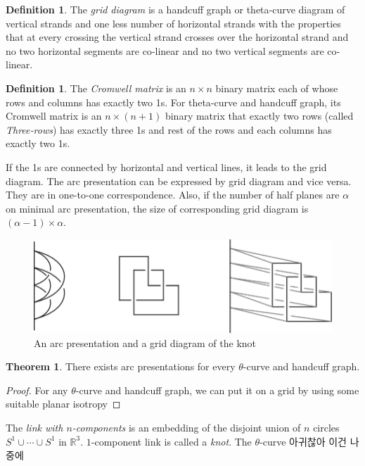 \documentclass{article}
\theoremstyle{definition}
\newtheorem{defn}[thm]{Definition}
\theoremstyle{theorem}
\newtheorem{theorem}{Theorem}
\theoremstyle{proposition}
\theoremstyle{corollary}
\begin{document}
\begin{defn}
    The \textit{grid diagram} is a handcuff graph or theta‐curve diagram of vertical strands and one less number of horizontal strands with the properties that at every crossing the vertical strand crosses over the horizontal strand and no two horizontal segments are co‐linear and no two vertical segments are co‐linear.
\end{defn}

\begin{defn}
   The \textit{Cromwell matrix} is an $n \times n$ binary matrix each of whose rows and columns has exactly two 1s. For theta‐curve and handcuff graph, its Cromwell matrix is an $n \times (n+1)$ binary matrix that exactly two rows (called \textit{Three‐rows}) has exactly three 1s and rest of the rows and each columns has exactly two 1s. 
\end{defn}

If the 1s are connected by horizontal and vertical lines, it leads to the grid diagram. The arc presentation can be expressed by grid diagram and vice versa. They are in one-to-one correspondence. Also, if the number of half planes are $\alpha$ on minimal arc presentation, the size of corresponding grid diagram is $(\alpha - 1) \times \alpha$.\\

\begin{figure}[h]
    \centerline{\includegraphics[width=0.5\linewidth]{An arc presentation and a grid diagram of the knot.png}}
    \caption{An arc presentation and a grid diagram of the knot}
    \label{figure_2}
\end{figure}

\begin{theorem}
    There exists arc presentations for every $\theta$-curve and handcuff graph. 
\end{theorem}
\begin{proof}
    For any $\theta$-curve and handcuff graph, we can put it on a grid by using some suitable planar isotropy
\end{proof}

The \textit{link with $n$-components} is an embedding of the disjoint union of $n$ circles $S^1 \cup \cdots \cup S^1$ in $\mathbb{R}^3$. $1$-component link is called a \textit{knot}. The $\theta$-curve 아귀찮아 이건 나중에\\
\end{document}
